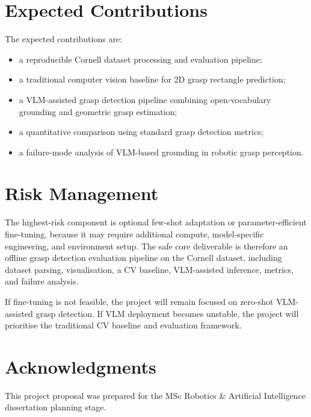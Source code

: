 \documentclass[11pt,a4paper]{article}
\begin{document}
\section{Expected Contributions}

The expected contributions are:

\begin{itemize}
    \item a reproducible Cornell dataset processing and evaluation pipeline;
    \item a traditional computer vision baseline for 2D grasp rectangle prediction;
    \item a VLM-assisted grasp detection pipeline combining open-vocabulary grounding and geometric grasp estimation;
    \item a quantitative comparison using standard grasp detection metrics;
    \item a failure-mode analysis of VLM-based grounding in robotic grasp perception.
\end{itemize}

\section{Risk Management}

The highest-risk component is optional few-shot adaptation or parameter-efficient fine-tuning, because it may require additional compute, model-specific engineering, and environment setup. The safe core deliverable is therefore an offline grasp detection evaluation pipeline on the Cornell dataset, including dataset parsing, visualisation, a CV baseline, VLM-assisted inference, metrics, and failure analysis.

If fine-tuning is not feasible, the project will remain focused on zero-shot VLM-assisted grasp detection. If VLM deployment becomes unstable, the project will prioritise the traditional CV baseline and evaluation framework.

\section{Acknowledgments}

This project proposal was prepared for the MSc Robotics \& Artificial Intelligence dissertation planning stage.



\end{document}

